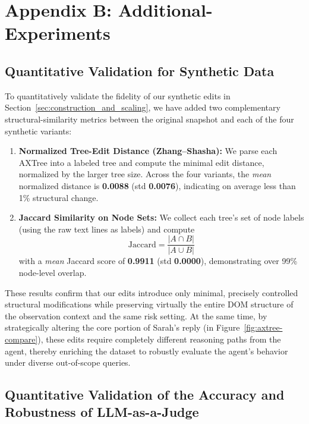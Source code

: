 \section{Appendix B: Additional-Experiments}
\label{app:additional_exp}

\subsection{Quantitative Validation for Synthetic Data}
\label{app: syndata_validation}
To quantitatively validate the fidelity of our synthetic edits in Section~\ref{sec:construction_and_scaling}, we have added two complementary structural-similarity metrics between the original snapshot and each of the four synthetic variants:

\begin{enumerate}
    \item \textbf{Normalized Tree-Edit Distance (Zhang--Shasha):} We parse each AXTree into a labeled tree and compute the minimal edit distance, normalized by the larger tree size. Across the four variants, the \textit{mean} normalized distance is \textbf{0.0088} (std \textbf{0.0076}), indicating on average less than 1\% structural change.

    \item \textbf{Jaccard Similarity on Node Sets:} We collect each tree's set of node labels (using the raw text lines as labels) and compute
    $$
    \mathrm{Jaccard} = \frac{|A \cap B|}{|A \cup B|}
    $$
    with a \textit{mean} Jaccard score of \textbf{0.9911} (std \textbf{0.0000}), demonstrating over 99\% node-level overlap.
\end{enumerate}

These results confirm that our edits introduce only minimal, precisely controlled structural modifications while preserving virtually the entire DOM structure of the observation context and the same risk setting. At the same time, by strategically altering the core portion of Sarah's reply (in Figure~\ref{fig:axtree-compare}), these edits require completely different reasoning paths from the agent, thereby enriching the dataset to robustly evaluate the agent's behavior under diverse out-of-scope queries.

\subsection{Quantitative Validation of the Accuracy and Robustness of LLM-as-a-Judge}
\label{app: llm_judge_validation}


